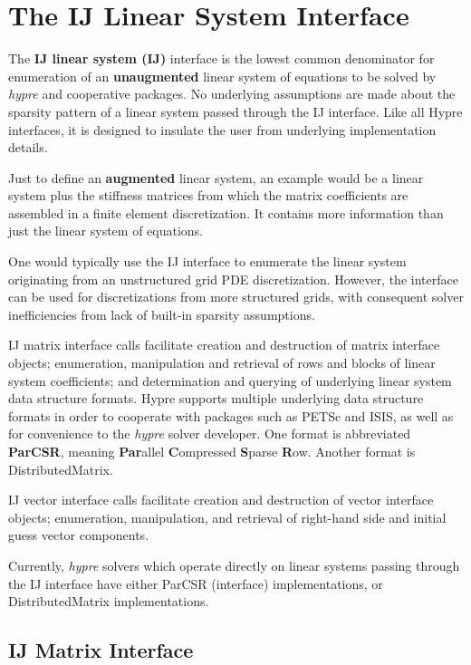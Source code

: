 \chapter{The IJ Linear System Interface}
\label{IJ}

The {\bf IJ linear system (IJ)} interface is the lowest common
denominator
for enumeration of an {\bf unaugmented} linear system of equations
to be solved by {\slshape hypre} and cooperative packages.
No underlying assumptions are made about the sparsity pattern of
a linear system passed through the IJ interface.
Like all Hypre interfaces, it is designed
to insulate the user from underlying implementation details.

Just to define an {\bf augmented} linear system, an example would be
a linear system plus the stiffness matrices from which the matrix
coefficients are assembled in a finite element discretization.
It contains more information than just the linear system
of equations.

One would typically use the IJ interface to enumerate the linear
system originating from an unstructured grid PDE discretization.
However, the interface can be used for discretizations from more
structured grids, with consequent solver inefficiencies from lack
of built-in sparsity assumptions.

IJ matrix interface calls facilitate creation and destruction of 
matrix interface objects; enumeration, manipulation and retrieval
of rows and blocks of linear system coefficients; and determination
and querying of underlying linear system data structure formats.
Hypre supports multiple underlying data structure formats in order
to cooperate
with packages such as PETSc and ISIS, as well as for convenience
to the {\slshape hypre} solver developer.
One format is abbreviated {\bf ParCSR}, meaning {\bf Par}allel
{\bf C}ompressed {\bf S}parse {\bf R}ow.  Another format
is DistributedMatrix.

IJ vector interface calls facilitate creation and destruction of
vector interface objects; enumeration, manipulation, and retrieval
of right-hand side and initial guess vector components.

Currently, {\slshape hypre} solvers which operate directly on linear
systems passing through the IJ interface have either
ParCSR (interface) implementations, or DistributedMatrix
implementations.

\section{IJ Matrix Interface}

